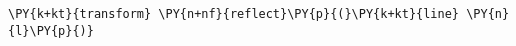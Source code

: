 \begin{Verbatim}[commandchars=\\\{\}]
    \PY{k+kt}{transform} \PY{n+nf}{reflect}\PY{p}{(}\PY{k+kt}{line} \PY{n}{l}\PY{p}{)}
\end{Verbatim}

